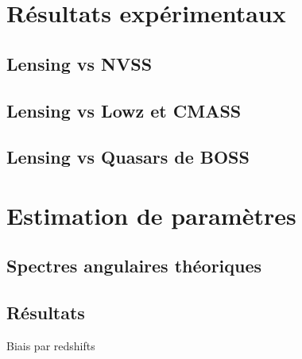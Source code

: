 \section{Résultats expérimentaux}
\subsection{Lensing vs NVSS}
\subsection{Lensing vs Lowz et CMASS}
\subsection{Lensing vs Quasars de BOSS}

\section{Estimation de paramètres}
\subsection{Spectres angulaires théoriques}
\subsection{Résultats}
Biais par redshifts